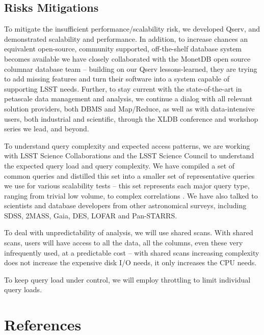 \documentclass[DM,lsstdraft,toc]{lsstdoc}
\begin{document}
\subsection{Risks Mitigations}\label{risks-mitigations}

To mitigate the insufficient performance/scalability risk, we developed Qserv,
and demonstrated scalability and performance. In addition, to increase chances
an equivalent open-source, community supported, off-the-shelf database system
becomes available we have closely collaborated with the MonetDB open source
columnar database team -- building on our Qserv lessons-learned, they are
trying to add missing features and turn their software into a system capable
of supporting LSST needs. Further, to stay current with the state-of-the-art
in petascale data management and analysis, we continue a dialog with all
relevant solution providers, both DBMS and Map/Reduce, as well as with data-intensive
users, both industrial and scientific, through the XLDB conference
and workshop series we lead, and beyond.

To understand query complexity and expected access patterns, we are
working with LSST Science Collaborations and the LSST Science Council to
understand the expected query load and query complexity. We have
compiled a set of common queries \citep{CommonQueries} and distilled
this set into a smaller set of representative queries we use for various
scalability tests -- this set represents each major query type, ranging
from trivial low volume, to complex correlations \citep{PerfTests}. We
have also talked to scientists and database developers from other
astronomical surveys, including SDSS, 2MASS, Gaia, DES, LOFAR and
Pan-STARRS.

To deal with unpredictability of analysis, we will use shared scans.
With shared scans, users will have access to all the data, all the
columns, even these very infrequently used, at a predictable cost --
with shared scans increasing complexity does not increase the expensive
disk I/O needs, it only increases the CPU needs.

To keep query load under control, we will employ throttling to limit
individual query loads.

\section{References}\label{references}
\renewcommand{\refname}{}

\end{document}

